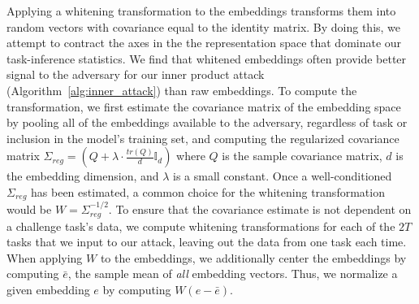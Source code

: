 Applying a whitening transformation to the embeddings transforms them into random vectors with covariance equal to the identity matrix. By doing this, we attempt to contract the axes in the the representation space that dominate our task-inference statistics. We find that whitened embeddings often provide better signal to the adversary for our inner product attack (Algorithm~\ref{alg:inner_attack}) than raw embeddings. To compute the transformation, we first estimate the covariance matrix of the embedding space by pooling all of the embeddings available to the adversary, regardless of task or inclusion in the model's training set, and computing the regularized covariance matrix $\Sigma_{reg} = (Q + \lambda \cdot \frac{tr(Q)}{d} \mathbb{I}_d)$ where $Q$ is the sample covariance matrix, $d$ is the embedding dimension, and $\lambda$ is a small constant. Once a well-conditioned $\Sigma_{reg}$ has been estimated, a common choice for the whitening transformation would be $W = \Sigma_{reg}^{-1/2}$. To ensure that the covariance estimate is not dependent on a challenge task's data, we compute whitening transformations for each of the $2T$ tasks that we input to our attack, leaving out the data from one task each time. When applying $W$ to the embeddings, we additionally center the embeddings by computing $\bar{e}$, the sample mean of \textit{all} embedding vectors. Thus, we normalize a given embedding $e$ by computing $W(e - \bar{e})$.